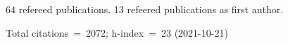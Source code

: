 64 refereed publications. 13 refeered publications as first author.

Total citations~=~2072; h-index~=~23 (2021-10-21)